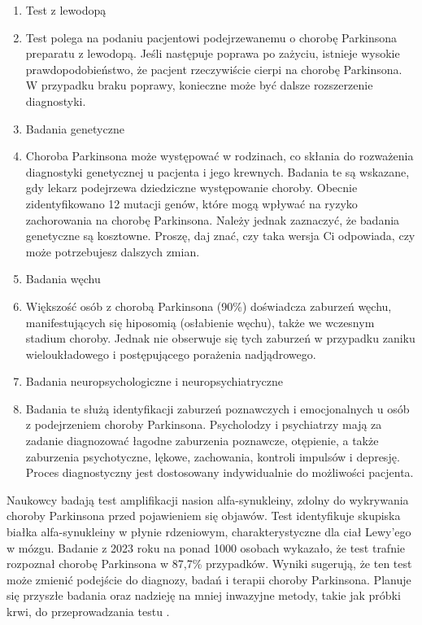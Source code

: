 \begin{enumerate}
	\item Test z lewodopą
	\item[]Test polega na podaniu pacjentowi podejrzewanemu o chorobę Parkinsona preparatu z lewodopą.
Jeśli następuje poprawa po zażyciu, istnieje wysokie prawdopodobieństwo, że pacjent rzeczywiście cierpi na chorobę Parkinsona.
W przypadku braku poprawy, konieczne może być dalsze rozszerzenie diagnostyki.

	\item Badania genetyczne
	\item[] Choroba Parkinsona może występować w rodzinach, co skłania do rozważenia diagnostyki genetycznej u pacjenta i jego krewnych.
Badania te są wskazane, gdy lekarz podejrzewa dziedziczne występowanie choroby.
Obecnie zidentyfikowano 12 mutacji genów, które mogą wpływać na ryzyko zachorowania na chorobę Parkinsona.
Należy jednak zaznaczyć, że badania genetyczne są kosztowne.
Proszę, daj znać, czy taka wersja Ci odpowiada, czy może potrzebujesz dalszych zmian.


	\item Badania węchu
	\item[] Większość osób z chorobą Parkinsona (90\%) doświadcza zaburzeń węchu, manifestujących się hiposomią (osłabienie węchu), także we wczesnym stadium choroby.
Jednak nie obserwuje się tych zaburzeń w przypadku zaniku wieloukładowego i postępującego porażenia nadjądrowego.

	\item Badania neuropsychologiczne i neuropsychiatryczne
	\item[] Badania te służą identyfikacji zaburzeń poznawczych i emocjonalnych u osób z podejrzeniem choroby Parkinsona.
Psycholodzy i psychiatrzy mają za zadanie diagnozować łagodne zaburzenia poznawcze, otępienie, a także zaburzenia psychotyczne, lękowe, zachowania, kontroli impulsów i depresję.
Proces diagnostyczny jest dostosowany indywidualnie do możliwości pacjenta.
\end{enumerate}

Naukowcy badają test amplifikacji nasion alfa-synukleiny, zdolny do wykrywania choroby Parkinsona przed pojawieniem się objawów.
Test identyfikuje skupiska białka alfa-synukleiny w płynie rdzeniowym, charakterystyczne dla ciał Lewy'ego w mózgu.
Badanie z 2023 roku na ponad 1000 osobach wykazało, że test trafnie rozpoznał chorobę Parkinsona w 87,7\% przypadków.
Wyniki sugerują, że ten test może zmienić podejście do diagnozy, badań i terapii choroby Parkinsona.
Planuje się przyszłe badania oraz nadzieję na mniej inwazyjne metody, takie jak próbki krwi, do przeprowadzania testu \cite{Mayo_Clinic_PD}.

